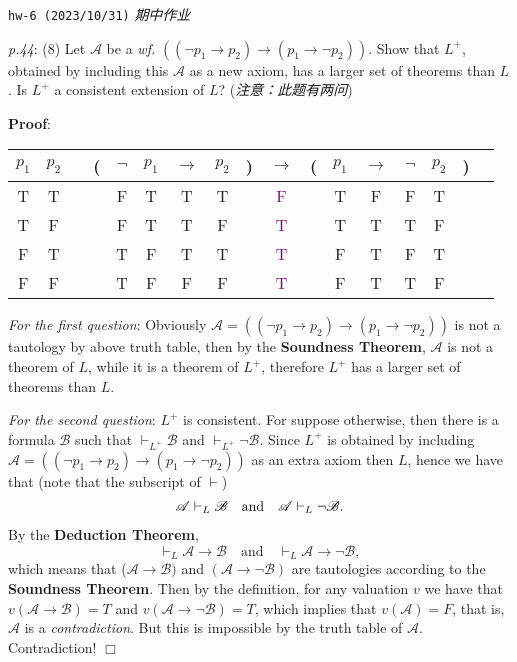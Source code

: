 \documentclass[UTF8,12pt,a4paper]{ctexart}
\begin{document}
\noindent\texttt{hw-6 (2023/10/31)}  \textit{期中作业}

\emph{p.44}: (8) \quad
Let $\mathscr{A}$ be a \textit{wf.} $((\neg p_1 \to p_2) \to (p_1 \to \neg p_2))$. 
Show that $L^+$, obtained by including this $\mathscr{A}$ as a new axiom, has a larger set of theorems than $L$. Is $L^+$ a consistent extension of $L$?
(\textit{注意：此题有两问})

\noindent\textbf{Proof}:

\begin{center}
	\begin{tabular}{@{ }c@{ }@{ }c | c@{ }@{}c@{}@{ }c@{ }@{ }c@{ }@{ }c@{ }@{ }c@{ }@{}c@{}@{ }c@{ }@{}c@{}@{ }c@{ }@{ }c@{ }@{ }c@{ }@{ }c@{ }@{}c@{}@{ }c}
		$p_1$ & $p_2$ &  & ( & $\lnot$ & $p_1$ & $\to$ & $p_2$ & ) & $\to$ & ( & $p_1$ & $\to$ & $\lnot$ & $p_2$ & ) & \\
		\hline 
		T & T &  &  & F & T & T & T &  & \textcolor{purple}{F} &  & T & F & F & T &  & \\
		T & F &  &  & F & T & T & F &  & \textcolor{purple}{T} &  & T & T & T & F &  & \\
		F & T &  &  & T & F & T & T &  & \textcolor{purple}{T} &  & F & T & F & T &  & \\
		F & F &  &  & T & F & F & F &  & \textcolor{purple}{T} &  & F & T & T & F &  & \\
	\end{tabular}
\end{center}

\textit{For the first question}:
Obviously $\mathscr{A} = ((\neg p_1 \to p_2) \to (p_1 \to \neg p_2))$ is not a tautology by above truth table, 
then by the \textbf{Soundness Theorem}, 
$\mathscr{A}$ is {\color{purple} not} a theorem of $L$, 
while it is a theorem of $L^+$, 
therefore $L^+$ has a larger set of theorems than $L$.

\textit{For the second question}:
$L^+$ is consistent. 
For suppose otherwise, then there is a formula $\mathscr{B}$ such that 
$\vdash_{L^+} \mathscr{B}$  and	$\vdash_{L^+} \neg \mathscr{B}$. 
Since $L^+$ is obtained by including $\mathscr{A} = ((\neg p_1 \to p_2) \to (p_1 \to \neg p_2))$ as an extra axiom then $L$, 
hence we have that (note that the {\color{purple} subscript} of $\vdash$)
\[\begin{array}{l l l}
	\mathscr{A} \vdash_{L} \mathscr{B}  \quad \text{and} \quad	
	\mathscr{A} \vdash_{L} \neg \mathscr{B}. \\
\end{array}\]
By the \textbf{Deduction Theorem}, 
\[
\vdash_{L} \mathscr{A} \to \mathscr{B}  \quad \text{and} \quad	
\vdash_{L} \mathscr{A} \to \neg \mathscr{B}, 
\]
which means that
($\mathscr{A} \to \mathscr{B})$ and $(\mathscr{A} \to \neg \mathscr{B})$ are tautologies according to the \textbf{Soundness Theorem}.
Then by the definition, for any valuation $v$ we have that 
$v(\mathscr{A} \to \mathscr{B})  = T$ and  $v(\mathscr{A} \to \neg \mathscr{B})  = T$,
which implies that $v(\mathscr{A}) = F$, that is, $\mathscr{A}$ is a \textit{contradiction}. But this is impossible by the truth table of $\mathscr{A}$. Contradiction!
\hfill $\Box$
\end{document}
